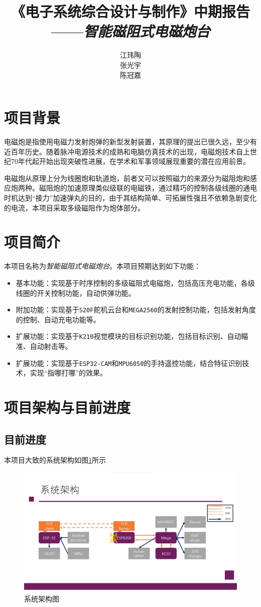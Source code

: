 \documentclass{article}
\title{《电子系统综合设计与制作》中期报告\\——\textit{智能磁阻式电磁炮台}}
\author{江玮陶\quad 2023010631\\张光宇\quad 2023010629\\陈冠嘉\quad 2023010503}
\begin{document}
\maketitle
\tableofcontents
\section{项目背景}
电磁炮是指使用电磁力发射炮弹的新型发射装置，其原理的提出已很久远，至少有近百年历史。随着脉冲电源技术的成熟和电脑仿真技术的出现，电磁炮技术自上世纪70年代起开始出现突破性进展，在学术和军事领域展现重要的潜在应用前景。

电磁炮从原理上分为线圈炮和轨道炮，前者又可以按照磁力的来源分为磁阻炮和感应炮两种。磁阻炮的加速原理类似级联的电磁铁，通过精巧的控制各级线圈的通电时机达到“接力”加速弹丸的目的，由于其结构简单、可拓展性强且不依赖急剧变化的电流，本项目采取多级磁阻作为炮体部分。

\section{项目简介}
本项目名称为\textit{智能磁阻式电磁炮台}。本项目预期达到如下功能：
\begin{itemize}
    \item 基本功能：实现基于时序控制的多级磁阻式电磁炮，包括高压充电功能，各级线圈的开关控制功能，自动供弹功能。
    \item 附加功能：实现基于\texttt{S20F}舵机云台和\texttt{MEGA2560}的发射控制功能，包括发射角度的控制、自动充电功能等。
    \item 扩展功能：实现基于\texttt{K210}视觉模块的目标识别功能，包括目标识别、自动瞄准、自动射击等。
    \item 扩展功能：实现基于\texttt{ESP32-CAM}和\texttt{MPU6050}的手持遥控功能，结合特征识别技术，实现“指哪打哪”的效果。
\end{itemize}
\section{项目架构与目前进度}
\subsection{目前进度}
本项目大致的系统架构如图\ref{prog}所示
\begin{figure}
\centering
\begin{minipage}[b]{0.85\linewidth}
    \centering
    \includegraphics[width=\linewidth]{imgs/systemStructure.png}
\end{minipage}
\caption{系统架构图}
\label{prog}
\end{figure}
\end{document}
